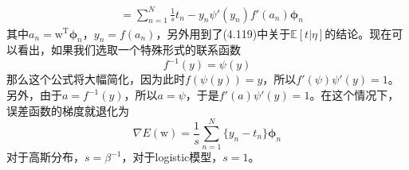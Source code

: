 \documentclass[b5paper]{book}
\numberwithin{equation}{chapter}
\newcommand {\bw} {\boldsymbol{\mathrm{w}}}
\newcommand {\rmT} {\mathrm{T}}
\newcommand {\bfphi} {\boldsymbol{\phi}}
\begin{document}
{\begin{equation}
\begin{split}
		&= \sum_{n=1}^N \frac{1}{s} {t_n - y_n} \psi'(y_n)f'(a_n)\bfphi_n
	\end{split}
	\end{equation}
	其中$a_n = \bw^{\rmT} \bfphi_n$，$y_n = f(a_n)$，另外用到了(4.119)中关于$\mathbb{E}[t|\eta]$的结论。现在可以看出，如果我们选取一个特殊形式的联系函数
	\begin{equation}
		f^{-1}(y) = \psi(y)
	\end{equation}
	那么这个公式将大幅简化，因为此时$f(\psi(y)) = y$，所以$f'(\psi)\psi'(y) = 1$。另外，由于$a = f^{-1}(y)$，所以$a = \psi$，于是$f'(a) \psi'(y) = 1$。在这个情况下，误差函数的梯度就退化为
	\begin{equation}
		\nabla E(\bw) = \frac{1}{s} \sum_{n=1}^N \{y_n - t_n\}\bfphi_n
	\end{equation}
	对于高斯分布，$s = \beta^{-1}$，对于logistic模型，$s = 1$。
	}
\end{document}
